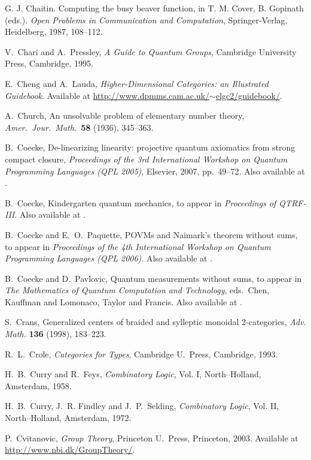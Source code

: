 \documentclass[12pt,twoside,openright]{report}
\begin{document}
\begin{thebibliography}{99}
G. J. Chaitin.  Computing the busy beaver function, in T. M. Cover, B. Gopinath (eds.).  \textsl{Open Problems in Communication and Computation}, Springer-Verlag, Heidelberg, 1987, 108--112.

 V.\ Chari and A.\ Pressley, \textsl{A Guide to Quantum Groups}, Cambridge University Press, Cambridge, 1995.

 E.\ Cheng and A.\ Lauda, \textsl{Higher-Dimensional Categories: an Illustrated Guidebook}.  Available at
\href{http://www.dpmms.cam.ac.uk/~elgc2/guidebook/}
{http://www.dpmms.cam.ac.uk/$\sim$elgc2/guidebook/}.

 A.\ Church, An unsolvable problem of elementary number theory, {\sl Amer.\ Jour.\ Math.\ }{\bf 58} (1936), 345--363.

 B.\ Coecke, De-linearizing linearity: projective quantum axiomatics from strong compact closure, {\sl Proceedings of the 3rd International Workshop on Quantum Programming Languages (QPL 2005)}, Elsevier, 2007, pp.\ 49--72.  Also available at .

 B.\ Coecke, Kindergarten quantum mechanics, to appear in {\sl Proceedings of QTRF-III}.  Also available at
.

 B.\ Coecke and E.\ O.\ Paquette, POVMs and Naimark's theorem without sums, to appear in {\sl Proceedings of the 4th International Workshop on Quantum Programming Languages (QPL 2006)}. Also available at .

 B.\ Coecke and D.\ Pavlovic, Quantum measurements without sums, to appear in {\sl The Mathematics of Quantum Computation and Technology}, eds.\ Chen, Kauffman and Lomonaco, Taylor and Francis. Also available at .

 S.\ Crans, Generalized centers of braided and sylleptic monoidal 2-categories, \textsl{Adv. Math.} \textbf{136} (1998), 183--223.

 R.\ L.\ Crole, {\sl Categories for Types}, Cambridge U.\ Press, Cambridge, 1993.

 H.\ B.\ Curry and R.\ Feys, {\sl Combinatory Logic}, Vol. I, North--Holland, Amsterdam, 1958.

H.\ B.\ Curry, J.\ R. Findley and J.\ P.\ Selding, {\sl Combinatory Logic}, Vol. II, North--Holland, Amsterdam, 1972.

 P.\ Cvitanovic, \textsl{Group Theory}, Princeton U.\ Press, Princeton, 2003.  Available at \hfill \break
\href{http://www.nbi.dk/GroupTheory/}{
http://www.nbi.dk/GroupTheory/}.


\end{thebibliography}
\end{document}
